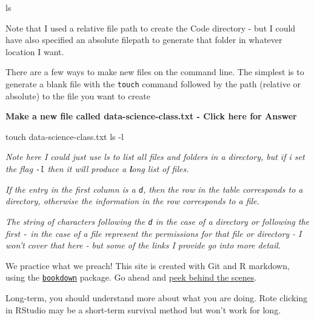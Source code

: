 \documentclass[
]{book}
\newenvironment{Shaded}{\begin{snugshade}}{\end{snugshade}}
\newcommand{\AttributeTok}[1]{\textcolor[rgb]{0.77,0.63,0.00}{#1}}
\newcommand{\FunctionTok}[1]{\textcolor[rgb]{0.00,0.00,0.00}{#1}}
\newcommand{\NormalTok}[1]{#1}
\begin{document}
\begin{Shaded}
\begin{Highlighting}[]
\FunctionTok{ls}
\end{Highlighting}
\end{Shaded}

Note that I used a relative file path to create the Code directory - but I could have also specified an absolute filepath to generate that folder in whatever location I want.

There are a few ways to make new files on the command line. The simplest is to generate a blank file with the \texttt{touch} command followed by the path (relative or absolute) to the file you want to create

\textbf{Make a new file called data-science-class.txt - Click here for Answer}

\begin{Shaded}
\begin{Highlighting}[]
\FunctionTok{touch}\NormalTok{ data{-}science{-}class.txt}
\FunctionTok{ls} \AttributeTok{{-}l}
\end{Highlighting}
\end{Shaded}

\emph{Note here I could just use ls to list all files and folders in a directory, but if i set the flag \texttt{-l} then it will produce a \textbf{l}ong list of files.}

\emph{If the entry in the first column is a \texttt{d}, then the row in the table corresponds to a directory, otherwise the information in the row corresponds to a file.}

\emph{The string of characters following the \texttt{d} in the case of a directory or following the first \texttt{-} in the case of a file represent the permissions for that file or directory - I won't cover that here - but some of the links I provide go into more detail.}

We practice what we preach! This site is created with Git and R markdown, using the \href{https://github.com/rstudio/bookdown/}{\texttt{bookdown}} package. Go ahead and \href{https://github.com/jennybc/happy-git-with-r}{peek behind the scenes}.

Long-term, you should understand more about what you are doing. Rote clicking in RStudio may be a short-term survival method but won't work for long.
\end{document}
